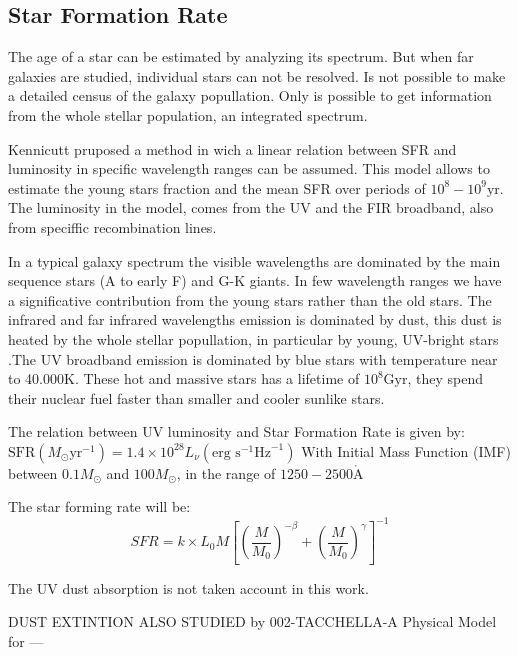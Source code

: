 \subsection{Star Formation Rate}

The age of a star can be estimated by analyzing its spectrum. But when far
galaxies are studied, individual stars can not be resolved. Is not 
possible to make a detailed census of the galaxy popullation. Only is possible 
to get information from the whole stellar population, an integrated spectrum.

Kennicutt pruposed a method in wich a linear relation between SFR and
luminosity in specific wavelength ranges can be assumed. This model allows to
estimate the young stars fraction and the mean SFR over periods of $10^8 - 10^9
\textrm{yr}$. The luminosity in the model, comes from the UV and the FIR
broadband, also from speciffic recombination lines. 

In a typical galaxy spectrum the visible wavelengths are dominated by the main 
sequence stars (A to early F) and G-K giants. In few wavelength ranges we have 
a significative contribution from the young stars rather than the old stars. 
The infrared and far infrared wavelengths emission is dominated by dust, this 
dust is  heated by the whole stellar popullation, in particular by young, 
UV-bright stars \citep{law11}.The UV broadband emission is dominated by blue 
stars with temperature near to 40.000K. These hot and massive stars has a 
lifetime of $10^8\textrm{Gyr}$, they spend their nuclear fuel faster than smaller 
and cooler sunlike stars.

The relation between UV luminosity and Star Formation Rate \citep{kennicutt98} 
is given by:
  $ \textrm{SFR}\left(M_\odot \textrm{yr}^{-1}\right) 
      = 1.4 \times 10^{28} L_{\nu} \left( \textrm{erg s}^{-1}\textrm{Hz}^{-1} 
\right)$
  With Initial Mass Function (IMF) between $0.1 M_\odot$ 
 and $100 M_\odot$, in the range of $1250-2500 \mathring{\textrm{A}} $

The star forming rate will be:
  \begin{equation}
  SFR = k \times L_{0} M \left[ \left( \frac{M}{M_0}\right)^{-\beta} 
		   + \left( \frac{M}{M_0}\right)^{\gamma} 
               \right]^{-1}
  \end{equation}

The UV dust absorption \citep{kennicutt09} is not taken account in this work.

DUST EXTINTION ALSO STUDIED by 002-TACCHELLA-A Physical Model for ---




